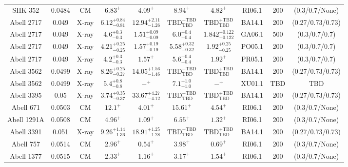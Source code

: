 \begin{table}
\begin{tabular}{cccccccccc}
SHK 352 & 0.0484 & CM & ${6.83}^{+}_{}$ & ${4.09}^{+}_{}$ & ${8.94}^{+}_{}$ & ${4.82}^{+}_{}$ & RI06.1 & 200 & (0.3/0.7/None) \\
Abell 2717 & 0.049 & X-ray & ${6.12}^{+0.84}_{-0.81}$ & ${12.94}^{+2.11}_{-1.26}$ & ${\mathrm{TBD}}^{+\mathrm{TBD}}_{\mathrm{TBD}}$ & ${\mathrm{TBD}}^{+\mathrm{TBD}}_{\mathrm{TBD}}$ & BA14.1 & 200 & (0.27/0.73/0.73) \\
Abell 2717 & 0.049 & X-ray & ${4.6}^{+0.3}_{-0.3}$ & ${1.51}^{+0.09}_{-0.09}$ & ${6.0}^{+0.4}_{-0.4}$ & ${1.842}^{+0.122}_{-0.122}$ & GA06.1 & 500 & (0.3/0.7/0.7) \\
Abell 2717 & 0.049 & X-ray & ${4.21}^{+0.25}_{-0.25}$ & ${1.57}^{+0.19}_{-0.19}$ & ${5.58}^{+0.32}_{-0.32}$ & ${1.92}^{+0.25}_{-0.25}$ & PO05.1 & 200 & (0.3/0.7/0.7) \\
Abell 2717 & 0.049 & X-ray & ${4.2}^{+0.3}_{-0.3}$ & ${1.57}^{+}_{}$ & ${5.6}^{+0.4}_{-0.4}$ & ${1.92}^{+}_{}$ & PR05.1 & 200 & (0.3/0.7/0.7) \\
Abell 3562 & 0.0499 & X-ray & ${8.26}^{+0.25}_{-0.27}$ & ${14.05}^{+1.56}_{-1.46}$ & ${\mathrm{TBD}}^{+\mathrm{TBD}}_{\mathrm{TBD}}$ & ${\mathrm{TBD}}^{+\mathrm{TBD}}_{\mathrm{TBD}}$ & BA14.1 & 200 & (0.27/0.73/0.73) \\
Abell 3562 & 0.0499 & X-ray & ${5.4}^{+0.8}_{-0.8}$ & ${-}^{+}_{}$ & ${7.1}^{+1.0}_{-1.0}$ & ${-}^{+}_{}$ & XU01.1 & TBD & TBD \\
Abell 3395 & 0.05 & X-ray & ${3.74}^{+0.35}_{-0.37}$ & ${33.67}^{+4.27}_{-4.12}$ & ${\mathrm{TBD}}^{+\mathrm{TBD}}_{\mathrm{TBD}}$ & ${\mathrm{TBD}}^{+\mathrm{TBD}}_{\mathrm{TBD}}$ & BA14.1 & 200 & (0.27/0.73/0.73) \\
Abell 671 & 0.0503 & CM & ${12.1}^{+}_{}$ & ${4.01}^{+}_{}$ & ${15.61}^{+}_{}$ & ${4.54}^{+}_{}$ & RI06.1 & 200 & (0.3/0.7/None) \\
Abell 1291A & 0.0508 & CM & ${4.96}^{+}_{}$ & ${1.09}^{+}_{}$ & ${6.55}^{+}_{}$ & ${1.32}^{+}_{}$ & RI06.1 & 200 & (0.3/0.7/None) \\
Abell 3391 & 0.051 & X-ray & ${9.26}^{+1.14}_{-1.36}$ & ${18.91}^{+1.25}_{-1.28}$ & ${\mathrm{TBD}}^{+\mathrm{TBD}}_{\mathrm{TBD}}$ & ${\mathrm{TBD}}^{+\mathrm{TBD}}_{\mathrm{TBD}}$ & BA14.1 & 200 & (0.27/0.73/0.73) \\
Abell 757 & 0.0514 & CM & ${2.96}^{+}_{}$ & ${0.54}^{+}_{}$ & ${3.98}^{+}_{}$ & ${0.69}^{+}_{}$ & RI06.1 & 200 & (0.3/0.7/None) \\
Abell 1377 & 0.0515 & CM & ${2.33}^{+}_{}$ & ${1.16}^{+}_{}$ & ${3.17}^{+}_{}$ & ${1.54}^{+}_{}$ & RI06.1 & 200 & (0.3/0.7/None) \\

\end{tabular}
\end{table}

